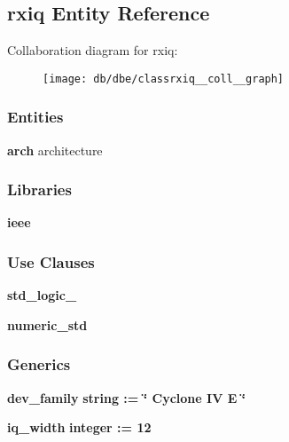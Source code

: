 \subsection{rxiq Entity Reference}
\label{classrxiq}


Collaboration diagram for rxiq\+:\nopagebreak
\begin{figure}[H]
\begin{center}
\leavevmode
\texttt{[image: db/dbe/classrxiq\_\_coll\_\_graph]}
\end{center}
\end{figure}
\subsubsection*{Entities}
\begin{DoxyCompactItemize}
\item 
{\bf arch} architecture
\end{DoxyCompactItemize}
\subsubsection*{Libraries}
 \begin{DoxyCompactItemize}
\item 
{\bf ieee} 
\end{DoxyCompactItemize}
\subsubsection*{Use Clauses}
 \begin{DoxyCompactItemize}
\item 
{\bf std\+\_\+logic\+\_}   
\item 
{\bf numeric\+\_\+std}   
\end{DoxyCompactItemize}
\subsubsection*{Generics}
 \begin{DoxyCompactItemize}
\item 
{\bf dev\+\_\+family} {\bfseries {\bfseries \textcolor{comment}{string}\textcolor{vhdlchar}{ }\textcolor{vhdlchar}{ }\textcolor{vhdlchar}{\+:}\textcolor{vhdlchar}{=}\textcolor{vhdlchar}{ }\textcolor{vhdlchar}{ }\textcolor{vhdlchar}{ }\textcolor{vhdlchar}{ }\textcolor{keyword}{\char`\"{} Cyclone I\+V E \char`\"{}}\textcolor{vhdlchar}{ }}}
\item 
{\bf iq\+\_\+width} {\bfseries {\bfseries \textcolor{comment}{integer}\textcolor{vhdlchar}{ }\textcolor{vhdlchar}{ }\textcolor{vhdlchar}{\+:}\textcolor{vhdlchar}{=}\textcolor{vhdlchar}{ }\textcolor{vhdlchar}{ } \textcolor{vhdldigit}{12} \textcolor{vhdlchar}{ }}}
\end{DoxyCompactItemize}
